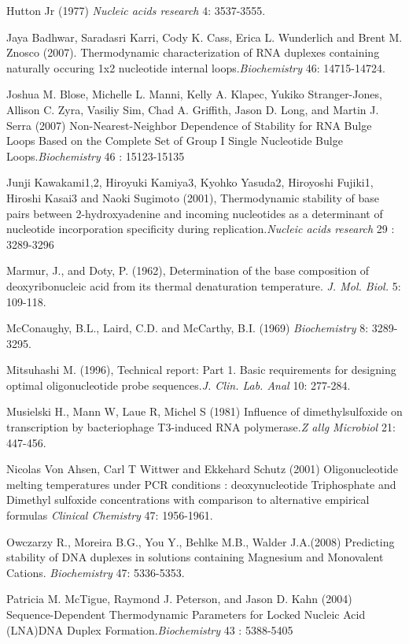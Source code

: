 \documentclass{article}
\begin{document}
Hutton Jr (1977) \textit{Nucleic acids research} 4: 3537-3555.

Jaya Badhwar, Saradasri Karri, Cody K. Cass, Erica L. Wunderlich and Brent M. Znosco (2007). 
Thermodynamic characterization of RNA duplexes containing naturally occuring 1x2 nucleotide 
internal loops.\textit{Biochemistry} 46: 14715-14724.

Joshua M. Blose, Michelle L. Manni, Kelly A. Klapec, Yukiko Stranger-Jones, Allison C.
Zyra, Vasiliy Sim, Chad A. Griffith, Jason D. Long, and Martin J. Serra (2007) 
Non-Nearest-Neighbor Dependence of Stability for RNA Bulge Loops Based on the Complete 
Set of Group I Single Nucleotide Bulge Loops.\textit{Biochemistry} 46 : 15123-15135

Junji Kawakami1,2, Hiroyuki Kamiya3, Kyohko Yasuda2, Hiroyoshi Fujiki1, Hiroshi Kasai3 and
Naoki Sugimoto (2001), Thermodynamic stability of base pairs between 2-hydroxyadenine and 
incoming nucleotides as a determinant of nucleotide incorporation specificity during 
replication.\textit{Nucleic acids research} 29 : 3289-3296

Marmur, J., and Doty, P. (1962), Determination of the base composition of deoxyribonucleic 
acid from its thermal denaturation temperature. \textit{J. Mol. Biol.} 5: 109-118.

McConaughy, B.L., Laird, C.D. and McCarthy, B.I. (1969) \textit{ Biochemistry} 8: 3289-3295.

Mitsuhashi M. (1996), Technical report: Part 1. Basic requirements for designing optimal 
oligonucleotide probe sequences.\textit{J. Clin. Lab. Anal} 10: 277-284.

Musielski H., Mann W, Laue R, Michel S (1981) Influence of dimethylsulfoxide on 
transcription by bacteriophage T3-induced RNA polymerase.\textit{Z allg Microbiol}
21: 447-456.

Nicolas Von Ahsen, Carl T Wittwer and Ekkehard Schutz (2001) Oligonucleotide melting 
temperatures under PCR conditions : deoxynucleotide Triphosphate and Dimethyl sulfoxide 
concentrations with comparison to alternative empirical formulas \textit{Clinical Chemistry}
47: 1956-1961.
 
 Owczarzy R., Moreira B.G., You Y., Behlke M.B., Walder J.A.(2008) Predicting stability of DNA duplexes 
 in solutions containing Magnesium and Monovalent Cations. \textit{Biochemistry} 47: 5336-5353.  

Patricia M. McTigue, Raymond J. Peterson, and Jason D. Kahn (2004) Sequence-Dependent 
Thermodynamic Parameters for Locked Nucleic Acid (LNA)DNA Duplex
Formation.\textit{Biochemistry} 
43 : 5388-5405
\end{document}

